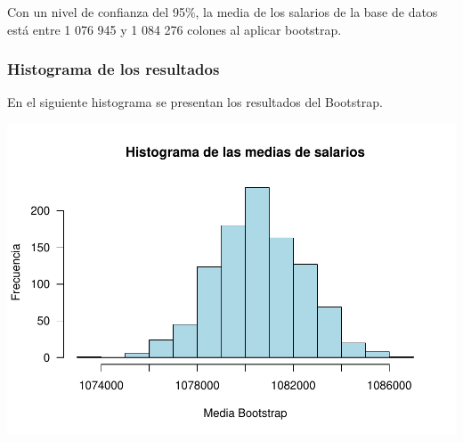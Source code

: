 \documentclass[
]{article}
\newenvironment{Shaded}{\begin{snugshade}}{\end{snugshade}}
\newcommand{\AttributeTok}[1]{\textcolor[rgb]{0.13,0.29,0.53}{#1}}
\newcommand{\DecValTok}[1]{\textcolor[rgb]{0.00,0.00,0.81}{#1}}
\newcommand{\FunctionTok}[1]{\textcolor[rgb]{0.13,0.29,0.53}{\textbf{#1}}}
\newcommand{\NormalTok}[1]{#1}
\newcommand{\SpecialCharTok}[1]{\textcolor[rgb]{0.81,0.36,0.00}{\textbf{#1}}}
\newcommand{\StringTok}[1]{\textcolor[rgb]{0.31,0.60,0.02}{#1}}
\begin{document}
Con un nivel de confianza del 95\%, la media de los salarios de la base
de datos está entre 1 076 945 y 1 084 276 colones al aplicar bootstrap.

\hypertarget{histograma-de-los-resultados}{%
\subsubsection{Histograma de los
resultados}\label{histograma-de-los-resultados}}

En el siguiente histograma se presentan los resultados del Bootstrap.

\begin{Shaded}
\end{Shaded}

\includegraphics{Tarea1_files/figure-latex/unnamed-chunk-38-1.pdf}
\end{document}

